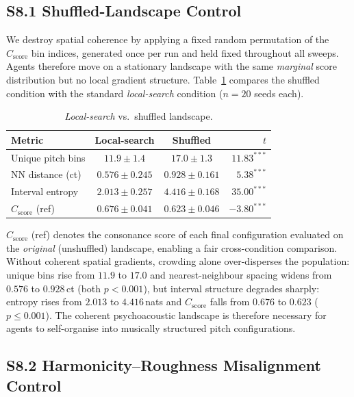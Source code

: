 \documentclass[letterpaper]{article}
\begin{document}
\subsection{S8.1 Shuffled-Landscape Control}

We destroy spatial coherence by applying a fixed random permutation of the $C_{\text{score}}$ bin indices, generated once per run and held fixed throughout all sweeps.
Agents therefore move on a stationary landscape with the same \emph{marginal} score distribution but no local gradient structure.
Table~\ref{tab:shuffled} compares the shuffled condition with the standard \emph{local-search} condition ($n=20$ seeds each).

\begin{table}[h]
\centering
\caption{\emph{Local-search} vs.\ shuffled landscape.}
\label{tab:shuffled}
\footnotesize
{\setlength{\tabcolsep}{4pt}
\begin{tabular}{@{}lccr@{}}
\toprule
\textbf{Metric} & \textbf{Local-search} & \textbf{Shuffled} & $t$ \\
\midrule
Unique pitch bins & $11.9 \pm 1.4$ & $17.0 \pm 1.3$ & $11.83^{***}$ \\
NN distance (ct)  & $0.576 \pm 0.245$ & $0.928 \pm 0.161$ & $5.38^{***}$ \\
Interval entropy  & $2.013 \pm 0.257$ & $4.416 \pm 0.168$ & $35.00^{***}$ \\
$C_{\text{score}}$ (ref) & $0.676 \pm 0.041$ & $0.623 \pm 0.046$ & $-3.80^{***}$ \\
\bottomrule
\end{tabular}
}
\end{table}

$C_{\text{score}}$ (ref) denotes the consonance score of each final configuration evaluated on the \emph{original} (unshuffled) landscape, enabling a fair cross-condition comparison.
Without coherent spatial gradients, crowding alone over-disperses the population: unique bins rise from $11.9$ to $17.0$ and nearest-neighbour spacing widens from $0.576$ to $0.928$\,ct (both $p < 0.001$), but interval structure degrades sharply: entropy rises from $2.013$ to $4.416$\,nats and $C_{\text{score}}$ falls from $0.676$ to $0.623$ ($p \le 0.001$).
The coherent psychoacoustic landscape is therefore necessary for agents to self-organise into musically structured pitch configurations.

\subsection{S8.2 Harmonicity--Roughness Misalignment Control}
\end{document}

